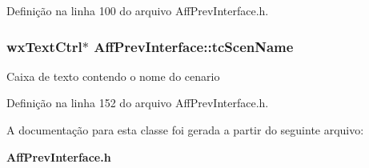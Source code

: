 Definição na linha 100 do arquivo Aff\+Prev\+Interface.\+h.

\subsubsection[{tc\+Scen\+Name}]{\setlength{\rightskip}{0pt plus 5cm}wx\+Text\+Ctrl$\ast$ Aff\+Prev\+Interface\+::tc\+Scen\+Name}\label{class_aff_prev_interface_aa61952f3099906bd381d67226ccf14a9}
Caixa de texto contendo o nome do cenario 

Definição na linha 152 do arquivo Aff\+Prev\+Interface.\+h.



A documentação para esta classe foi gerada a partir do seguinte arquivo\+:\begin{DoxyCompactItemize}
\item 
{\bf Aff\+Prev\+Interface.\+h}\end{DoxyCompactItemize}
